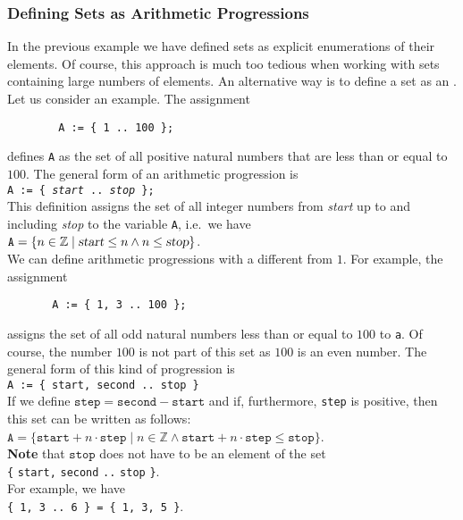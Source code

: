 \subsubsection{Defining Sets as Arithmetic Progressions}
In the previous example we have defined sets as explicit enumerations of their elements.  Of course,
this approach is much too tedious when working with sets containing large numbers of elements.  An
alternative way is to define a set as an .  Let us consider an example.  The assignment
\begin{verbatim}
        A := { 1 .. 100 };
\end{verbatim}
defines \texttt{A} as the set of all positive natural numbers that are less than or equal to $100$.
The general form of an arithmetic progression is
\\[0.2cm]
\hspace*{1.3cm} 
\texttt{A := \{ \textsl{start} .. \textsl{stop} \};} 
\\[0.2cm]
This definition assigns the set of all integer numbers from \textsl{start} up to and including
\textsl{stop} to the variable \texttt{A}, i.e.~we have
 \\[0.2cm]
\hspace*{1.3cm} 
$\texttt{A} = \{ n \in \mathbb{Z} \mid \textsl{start} \leq n \wedge n \leq\textsl{stop} \}$. 
\\[0.2cm]
We can define arithmetic progressions with a  different from $1$.  For example,
the assignment
\begin{verbatim}
       A := { 1, 3 .. 100 };
\end{verbatim}
assigns the set of all odd natural numbers less than or equal to $100$ to \texttt{a}.
Of course, the number $100$ is not part of this set as $100$ is an even number.
The general form of this kind of progression is
\\[0.2cm]
\hspace*{1.3cm} 
\texttt{A := \{ start, second .. stop \}} 
\\[0.2cm]
If we define $\texttt{step} = \texttt{second} - \texttt{start}$ and if, furthermore,  \texttt{step}
is positive, then this set can be written as follows:
\\[0.2cm]
\hspace*{1.3cm} 
$\texttt{A} = \{ \texttt{start} + n \cdot \texttt{step} \mid n \in \mathbb{Z} \wedge \texttt{start} + n \cdot \texttt{step} \leq\texttt{stop} \}$. 
\\[0.2cm]
\textbf{Note} that  $\texttt{stop}$ does not have to be an element of the set
\\[0.2cm]
\hspace*{1.3cm}
\texttt{\{} \texttt{start}\texttt{,} \texttt{second} \texttt{..} \texttt{stop} \texttt{\}}.
\\[0.2cm]
For example, we have
\\[0.2cm]
\hspace*{1.3cm}
\texttt{\{ 1, 3 .. 6 \} = \{ 1, 3, 5 \}}.


